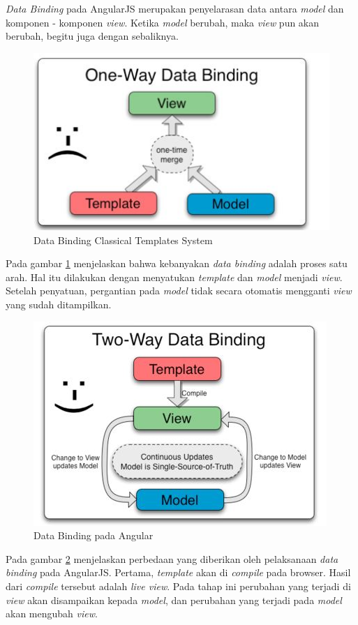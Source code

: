 		\textit{Data Binding} pada AngularJS merupakan penyelarasan data antara \textit{model} dan komponen - komponen \textit{view}. Ketika \textit{model} berubah, maka \textit{view} pun akan berubah, begitu juga dengan sebaliknya.
		
		\begin{figure}[H]
			\centering
			\includegraphics[scale=0.75]{Gambar/Dabin1}
			\caption{Data Binding Classical Templates System}
			\label{fig:dabin1}
		\end{figure}
		Pada gambar \ref{fig:dabin1} menjelaskan bahwa kebanyakan \textit{data binding} adalah proses satu arah. Hal itu dilakukan dengan menyatukan \textit{template} dan \textit{model} menjadi \textit{view}. Setelah penyatuan, pergantian pada \textit{model} tidak secara otomatis mengganti \textit{view} yang sudah ditampilkan.
		\begin{figure}[H]
			\centering
			\includegraphics[scale=0.75]{Gambar/Dabin2}
			\caption{Data Binding pada Angular}
			\label{fig:dabin2}
		\end{figure}
		Pada gambar \ref{fig:dabin2} menjelaskan perbedaan yang diberikan oleh pelaksanaan \textit{data binding} pada AngularJS. Pertama, \textit{template} akan di \textit{compile} pada browser. Hasil dari \textit{compile} tersebut adalah \textit{live view}. Pada tahap ini perubahan yang terjadi di \textit{view} akan disampaikan kepada \textit{model}, dan perubahan yang terjadi pada \textit{model} akan mengubah \textit{view}.
		
